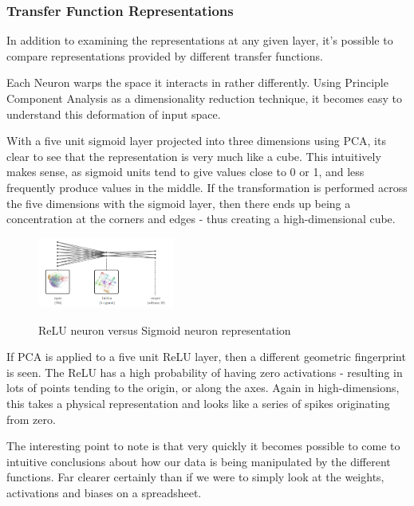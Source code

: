 \documentclass[a4paper,11pt,titlepage]{article}
\begin{document}
		\subsubsection{Transfer Function Representations}
		In addition to examining the representations at any given layer, it's possible to compare representations provided by different transfer functions. 
		\par 
		Each Neuron warps the space it interacts in rather differently. Using Principle Component Analysis as a dimensionality reduction technique, it becomes easy to understand this deformation of input space.
		\par 
		With a five unit sigmoid layer projected into three dimensions using PCA, its clear to see that the representation is very much like a cube. This intuitively makes sense, as sigmoid units tend to give values close to 0 or 1, and less frequently produce values in the middle. If the transformation is performed across the five dimensions with the sigmoid layer, then there ends up being a concentration at the corners and edges - thus creating a high-dimensional cube. 
		\par 
		
		\begin{figure}[H]
    			\qquad
    			{{\includegraphics[width=0.4\textwidth]
    				{img/colah_sigmoid.png} 
    			}}%
    			\caption{ReLU neuron versus Sigmoid neuron representation}%
		\end{figure}
 		
		If PCA is applied to a five unit ReLU layer, then a different geometric fingerprint is seen. The ReLU has a high probability of having zero activations - resulting in lots of points tending to the origin, or along the axes. Again in high-dimensions, this takes a physical representation and looks like a series of spikes originating from zero. 		
		\par 
		The interesting point to note is that very quickly it becomes possible to come to intuitive conclusions about how our data is being manipulated by the different functions. Far clearer certainly than if we were to simply look at the weights, activations and biases on a spreadsheet. 
		\par 
		
\end{document}
